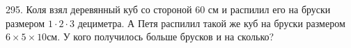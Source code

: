 295. Коля взял деревянный куб со стороной 60 см и распилил его на бруски размером $1\cdot2\cdot3$ дециметра. А Петя распилил такой же куб на бруски размером $6\times5\times10$см. У кого получилось больше брусков и на сколько?\\
